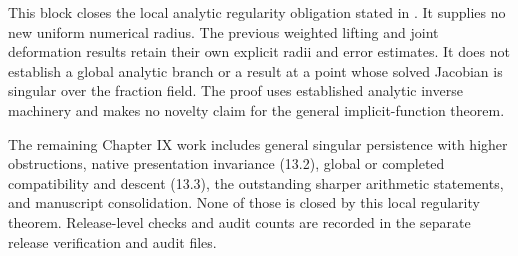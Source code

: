 This block closes the local analytic regularity obligation stated in
. It supplies no new uniform numerical
radius. The previous weighted lifting and joint deformation results
retain their own explicit radii and error estimates. It does not
establish a global analytic branch or a result at a point whose solved
Jacobian is singular over the fraction field. The proof uses established
analytic inverse machinery and makes no novelty claim for the general
implicit-function theorem.

The remaining Chapter IX work includes general singular persistence with
higher obstructions, native presentation invariance (13.2), global or
completed compatibility and descent (13.3), the outstanding sharper
arithmetic statements, and manuscript consolidation. None of those is
closed by this local regularity theorem. Release-level checks and audit
counts are recorded in the separate release verification and audit
files.
